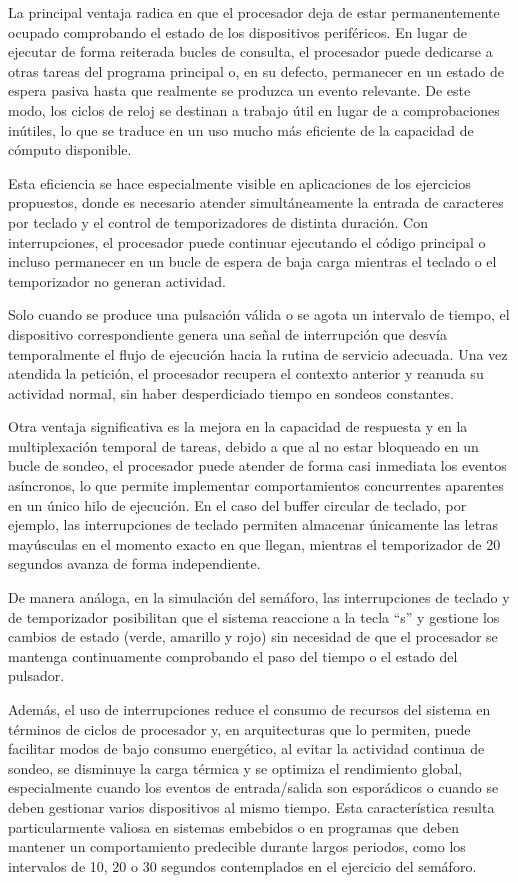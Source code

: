 \documentclass[12pt, letterpaper]{article}
\begin{document}
 La principal ventaja radica en que el procesador deja de estar permanentemente ocupado comprobando el estado de los dispositivos periféricos. En lugar de ejecutar de forma reiterada bucles de consulta, el procesador puede dedicarse a otras tareas del programa principal o, en su defecto, permanecer en un estado de espera pasiva hasta que realmente se produzca un evento relevante. De este modo, los ciclos de reloj se destinan a trabajo útil en lugar de a comprobaciones inútiles, lo que se traduce en un uso mucho más eficiente de la capacidad de cómputo disponible.

 Esta eficiencia se hace especialmente visible en aplicaciones de los ejercicios propuestos, donde es necesario atender simultáneamente la entrada de caracteres por teclado y el control de temporizadores de distinta duración. Con interrupciones, el procesador puede continuar ejecutando el código principal o incluso permanecer en un bucle de espera de baja carga mientras el teclado o el temporizador no generan actividad. 

 Solo cuando se produce una pulsación válida o se agota un intervalo de tiempo, el dispositivo correspondiente genera una señal de interrupción que desvía temporalmente el flujo de ejecución hacia la rutina de servicio adecuada. Una vez atendida la petición, el procesador recupera el contexto anterior y reanuda su actividad normal, sin haber desperdiciado tiempo en sondeos constantes.

 Otra ventaja significativa es la mejora en la capacidad de respuesta y en la multiplexación temporal de tareas, debido a que al no estar bloqueado en un bucle de sondeo, el procesador puede atender de forma casi inmediata los eventos asíncronos, lo que permite implementar comportamientos concurrentes aparentes en un único hilo de ejecución. En el caso del buffer circular de teclado, por ejemplo, las interrupciones de teclado permiten almacenar únicamente las letras mayúsculas en el momento exacto en que llegan, mientras el temporizador de 20 segundos avanza de forma independiente. 

 De manera análoga, en la simulación del semáforo, las interrupciones de teclado y de temporizador posibilitan que el sistema reaccione a la tecla “s” y gestione los cambios de estado (verde, amarillo y rojo) sin necesidad de que el procesador se mantenga continuamente comprobando el paso del tiempo o el estado del pulsador.

 Además, el uso de interrupciones reduce el consumo de recursos del sistema en términos de ciclos de procesador y, en arquitecturas que lo permiten, puede facilitar modos de bajo consumo energético, al evitar la actividad continua de sondeo, se disminuye la carga térmica y se optimiza el rendimiento global, especialmente cuando los eventos de entrada/salida son esporádicos o cuando se deben gestionar varios dispositivos al mismo tiempo. Esta característica resulta particularmente valiosa en sistemas embebidos o en programas que deben mantener un comportamiento predecible durante largos periodos, como los intervalos de 10, 20 o 30 segundos contemplados en el ejercicio del semáforo.
\end{document}

